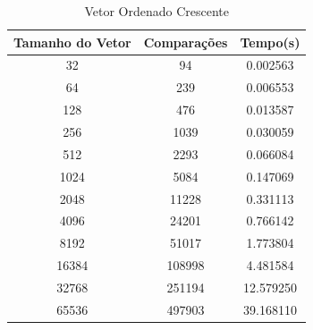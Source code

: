 \documentclass[12pt,a4paper,twoside]{report}
\begin{document}
\begin{table}[h]
  \centering
  \caption{Vetor Ordenado Crescente \label{tab:oc}}
  \begin{tabular}{ccc} \\\hline
  \textbf{Tamanho do Vetor} & \textbf{Comparações} & \textbf{Tempo(s)} \\\hline
  32                        & 94                   & 0.002563          \\\hline
  64                        & 239                  & 0.006553          \\\hline
  128                       & 476                  & 0.013587          \\\hline
  256                       & 1039                 & 0.030059          \\\hline
  512                       & 2293                 & 0.066084          \\\hline
  1024                      & 5084                 & 0.147069          \\\hline
  2048                      & 11228                & 0.331113          \\\hline
  4096                      & 24201                & 0.766142         \\\hline
  8192                      & 51017                & 1.773804        \\\hline
  16384                     & 108998               & 4.481584        \\\hline
  32768                     & 251194               & 12.579250        \\\hline
  65536                     & 497903               & 39.168110        \\\hline
  \end{tabular}
\end{table}
\end{document}
